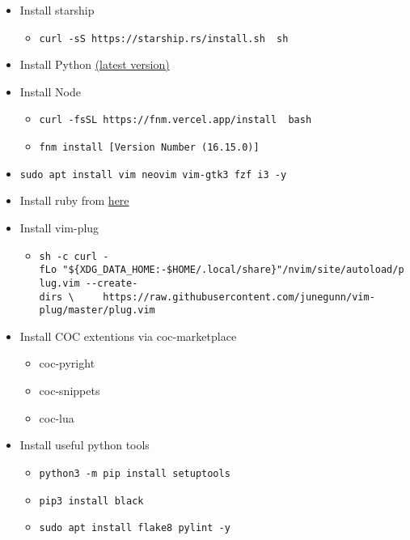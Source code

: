 \begin{itemize}
\tightlist
\item
  Install starship

  \begin{itemize}
  \tightlist
  \item
    \texttt{curl\ -sS\ https://starship.rs/install.sh\ \textbar{}\ sh}
  \end{itemize}
\item
  Install Python
  \href{https://www.python.org/ftp/python/3.10.4/Python-3.10.4.tgz}{(latest
  version)}
\item
  Install Node

  \begin{itemize}
  \tightlist
  \item
    \texttt{curl\ -fsSL\ https://fnm.vercel.app/install\ \textbar{}\ bash}
  \item
    \texttt{fnm\ install\ {[}Version\ Number\ (16.15.0){]}}
  \end{itemize}
\item
  \texttt{sudo\ apt\ install\ vim\ neovim\ vim-gtk3\ fzf\ i3\ -y}
\item
  Install ruby from
  \href{https://cache.ruby-lang.org/pub/ruby/3.1/ruby-3.1.2.tar.gz}{here}
\item
  Install vim-plug

  \begin{itemize}
  \tightlist
  \item
    \texttt{sh\ -c\ \textquotesingle{}curl\ -fLo\ "\$\{XDG\_DATA\_HOME:-\$HOME/.local/share\}"/nvim/site/autoload/plug.vim\ -\/-create-dirs\ \textbackslash{}\ \ \ \ \ https://raw.githubusercontent.com/junegunn/vim-plug/master/plug.vim\textquotesingle{}}
  \end{itemize}
\item
  Install COC extentions via coc-marketplace

  \begin{itemize}
  \tightlist
  \item
    coc-pyright
  \item
    coc-snippets
  \item
    coc-lua
  \end{itemize}
\item
  Install useful python tools

  \begin{itemize}
  \tightlist
  \item
    \texttt{python3\ -m\ pip\ install\ setuptools}
  \item
    \texttt{pip3\ install\ black}
  \item
    \texttt{sudo\ apt\ install\ flake8\ pylint\ -y}
  \end{itemize}
\end{itemize}

